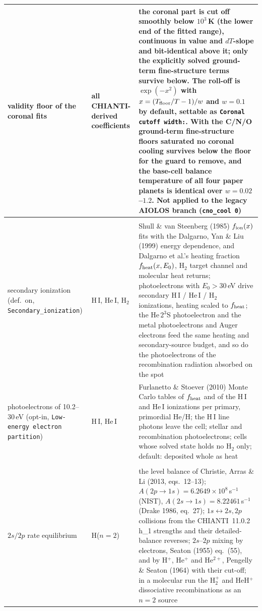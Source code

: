 \documentclass[english,a4paper]{my_memo}
\begin{document}
\begin{longtable}{@{}>{\raggedright\arraybackslash\hyphenpenalty=10000\exhyphenpenalty=10000}p{}p{}p{}@{}}
validity floor of the coronal fits & all CHIANTI-derived coefficients & the coronal part is cut off smoothly below $10^{3}$\,K (the lower end of the fitted range), continuous in value and $dT$-slope and bit-identical above it; only the explicitly solved ground-term fine-structure terms survive below. The roll-off is $\exp(-x^2)$ with $x=(T_{\rm floor}/T-1)/w$ and $w=0.1$ by default, settable as \texttt{Coronal cutoff width:}. With the C/N/O ground-term fine-structure floors saturated no coronal cooling survives below the floor for the guard to remove, and the base-cell balance temperature of all four paper planets is identical over $w = 0.02$--$1.2$. Not applied to the legacy AIOLOS branch (\texttt{cno\_cool 0}) \\
\midrule
\multicolumn{3}{@{}l}{\textbf{Photoelectric heating}}\\[2pt]
secondary ionization (def.\ on, \texttt{Secondary\_}\allowbreak\texttt{ionization}) & H\,I, He\,I, H$_2$ & Shull \& van Steenberg (1985) $f_{\rm ion}(x)$ fits with the Dalgarno, Yan \& Liu (1999) energy dependence, and Dalgarno et al.'s heating fraction $f_{\rm heat}(x,E_0)$, H$_2$ target channel and molecular heat returns; photoelectrons with $E_0>30\,$eV drive secondary H\,I / He\,I / H$_2$ ionizations, heating scaled to $f_{\rm heat}$; the He\,$2^3$S photoelectron and the metal photoelectrons and Auger electrons feed the same heating and secondary-source budget, and so do the photoelectrons of the recombination radiation absorbed on the spot \\
photoelectrons of 10.2--30\,eV (opt-in, \texttt{Low-energy}\allowbreak\texttt{ electron partition}) & H\,I, He\,I & Furlanetto \& Stoever (2010) Monte Carlo tables of $f_{\rm heat}$ and of the H\,I and He\,I ionizations per primary, primordial He/H; the H\,I line photons leave the cell; stellar and recombination photoelectrons; cells whose solved state holds no H$_2$ only; default: deposited whole as heat \\
\midrule
\multicolumn{3}{@{}l}{\textbf{Excited hydrogen H($n{=}2$) and Ly$\alpha$}}\\[2pt]
$2s/2p$ rate equilibrium & H($n{=}2$) & the level balance of Christie, Arras \& Li (2013, eqs.~12--13); $A(2p\to1s)=6.2649\times10^8$\,s$^{-1}$ (NIST), $A(2s\to1s)=8.22461$\,s$^{-1}$ (Drake 1986, eq.~27); $1s\leftrightarrow2s,2p$ collisions from the CHIANTI~11.0.2 h\_1 strengths and their detailed-balance reverses; $2s$--$2p$ mixing by electrons, Seaton (1955) eq.~(55), and by H$^+$, He$^+$ and He$^{2+}$, Pengelly \& Seaton (1964) with their cut-off; in a molecular run the H$_2^+$ and HeH$^+$ dissociative recombinations as an $n{=}2$ source \\

\end{longtable}
\end{document}
